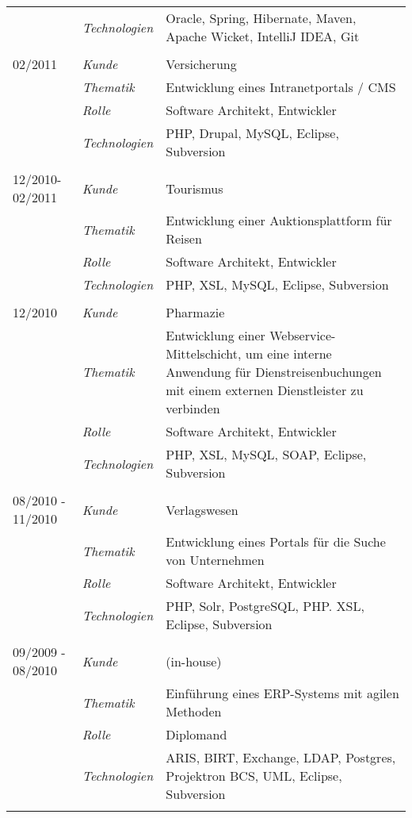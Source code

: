 \begin{longtable}{@{}>{}p{4cm}>{\itshape}p{2cm}>{}p{9cm}}
\nopagebreak		& Technologien	& Oracle, Spring, Hibernate, Maven, Apache Wicket, IntelliJ IDEA, Git\\
\\
02/2011             & Kunde 	    & Versicherung\\
\nopagebreak		& Thematik	    & Entwicklung eines Intranetportals / CMS\\
\nopagebreak		& Rolle 	    & Software Architekt, Entwickler\\
\nopagebreak		& Technologien	& PHP, Drupal, MySQL, Eclipse, Subversion\\
\\
12/2010-02/2011     & Kunde 	    & Tourismus\\
\nopagebreak		& Thematik	    & Entwicklung einer Auktionsplattform für Reisen\\
\nopagebreak		& Rolle 	    & Software Architekt, Entwickler\\
\nopagebreak		& Technologien	& PHP, XSL, MySQL, Eclipse, Subversion\\
\\
12/2010         	& Kunde 	    & Pharmazie\\
\nopagebreak		& Thematik	    & Entwicklung einer Webservice-Mittelschicht, um eine interne Anwendung für Dienstreisenbuchungen mit einem externen Dienstleister zu verbinden\\
\nopagebreak		& Rolle 	    & Software Architekt, Entwickler\\
\nopagebreak		& Technologien	& PHP, XSL, MySQL, SOAP, Eclipse, Subversion\\
\\
08/2010 - 11/2010	& Kunde 	    & Verlagswesen\\
\nopagebreak		& Thematik	    & Entwicklung eines Portals für die Suche von Unternehmen\\
\nopagebreak		& Rolle 	    & Software Architekt, Entwickler\\
\nopagebreak		& Technologien	& PHP, Solr, PostgreSQL, PHP. XSL, Eclipse, Subversion\\
\\
09/2009 - 08/2010	& Kunde 	    & (in-house)\\
\nopagebreak		& Thematik	    & Einführung eines ERP-Systems mit agilen Methoden\\
\nopagebreak		& Rolle 	    & Diplomand\\
\nopagebreak		& Technologien	& ARIS, BIRT, Exchange, LDAP, Postgres, Projektron BCS, UML, Eclipse, Subversion\\
\\

\end{longtable}
